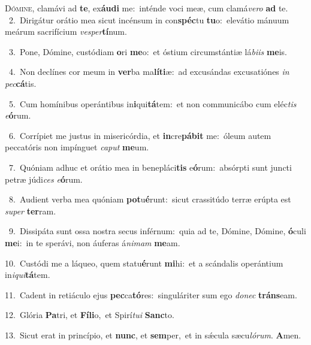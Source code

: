 \lettrine{\initial\textcolor{\initialcolor}{D}}{ómine,} clamávi ad \textbf{te}\-, ex\-\textbf{áu}\-\textbf{di} me:~\star inténde voci meæ, cum clamá\-\textit{ve}\-\textit{ro} \textbf{ad} te.\\
{\numbfont\textcolor{\numbcolor}{~2.}}~Dirigátur orátio mea sicut incénsum in con\-\textbf{spéc}\-tu \textbf{tu}\-o:~\star elevátio mánuum meárum sacrifícium \textit{ves}\-\textit{per}\textbf{tí}num.\par
{\numbfont\textcolor{\numbcolor}{~3.}}~Pone, Dómine, custódiam \textbf{o}\-ri \textbf{me}\-o:~\star et óstium circumstántiæ lá\-\textit{bi}\-\textit{is} \textbf{me}\-is.\par
{\numbfont\textcolor{\numbcolor}{~4.}}~Non declínes cor meum in \textbf{ver}\-ba ma\-\textbf{lí}\-\textbf{ti}æ:~\star ad excusándas excusatiónes \textit{in} \textit{pec}\-\textbf{cá}tis.\par
{\numbfont\textcolor{\numbcolor}{~5.}}~Cum homínibus operántibus in\-\textbf{i}\-qui\-\textbf{tá}\-tem:~\star et non communicábo cum eléc\textit{tis} \textit{e}\-\textbf{ó}rum.\par
{\numbfont\textcolor{\numbcolor}{~6.}}~Corrípiet me justus in misericórdia, et \textbf{in}\-cre\-\textbf{pá}\-\textbf{bit} me:~\star óleum autem peccatóris non impínguet \textit{ca}\-\textit{put} \textbf{me}\-um.\par
{\numbfont\textcolor{\numbcolor}{~7.}}~Quóniam adhuc et orátio mea in benepláci\textbf{tis} e\-\textbf{ó}\-rum:~\star absórpti sunt juncti petræ júdi\textit{ces} \textit{e}\-\textbf{ó}rum.\par
{\numbfont\textcolor{\numbcolor}{~8.}}~Audient verba mea quóniam \textbf{pot}\-u\-\textbf{é}\-runt:~\star sicut crassitúdo terræ erúpta est \textit{su}\-\textit{per} \textbf{ter}\-ram.\par
{\numbfont\textcolor{\numbcolor}{~9.}}~Dissipáta sunt ossa nostra secus inférnum:~\dagger quia ad te, Dómine, Dómine, \textbf{ó}\-culi \textbf{me}\-i:~\star in te sperávi, non áuferas á\-\textit{ni}\-\textit{mam} \textbf{me}\-am.\par
{\numbfont\textcolor{\numbcolor}{10.}}~Custódi me a láqueo, quem statu\-\textbf{é}\-runt \textbf{mi}\-hi:~\star et a scándalis operántium in\-\textit{i}\-\textit{qui}\textbf{tá}tem.\par
{\numbfont\textcolor{\numbcolor}{11.}}~Cadent in retiáculo ejus \textbf{pec}\-ca\-\textbf{tó}\-res:~\star singuláriter sum ego \textit{do}\-\textit{nec} \textbf{tráns}\-eam.\par
{\numbfont\textcolor{\numbcolor}{12.}}~Glória \textbf{Pa}\-tri, et \textbf{Fí}\-\textbf{li}o,~\star et Spirí\-\textit{tu}\-\textit{i} \textbf{Sanc}\-to.\par
{\numbfont\textcolor{\numbcolor}{13.}}~Sicut erat in princípio, et \textbf{nunc}\-, et \textbf{sem}\-per,~\star et in sǽcula sæcu\-\textit{ló}\-\textit{rum}. \textbf{A}\-men.\par
